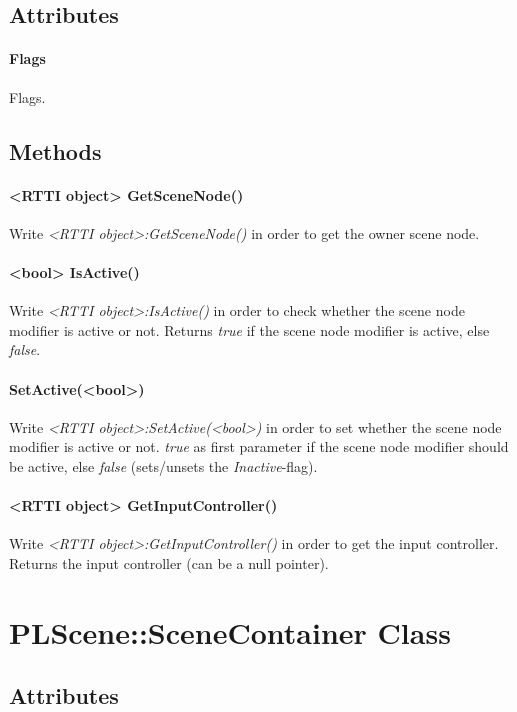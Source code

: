 \subsection{Attributes}

\paragraph{Flags}
Flags.


\subsection{Methods}

\paragraph{<RTTI object> GetSceneNode()}
Write \emph{<RTTI object>:GetSceneNode()} in order to get the owner scene node.

\paragraph{<bool> IsActive()}
Write \emph{<RTTI object>:IsActive()} in order to check whether the scene node modifier is active or not. Returns \emph{true} if the scene node modifier is active, else \emph{false}.

\paragraph{SetActive(<bool>)}
Write \emph{<RTTI object>:SetActive(<bool>)} in order to set whether the scene node modifier is active or not. \emph{true} as first parameter if the scene node modifier should be active, else \emph{false} (sets/unsets the \emph{Inactive}-flag).

\paragraph{<RTTI object> GetInputController()}
Write \emph{<RTTI object>:GetInputController()} in order to get the input controller. Returns the input controller (can be a null pointer).




\section{PLScene::SceneContainer Class}


\subsection{Attributes}

